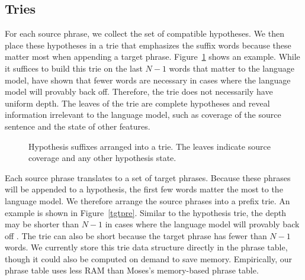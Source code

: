\documentclass[11pt]{article}
\begin{document}
\subsection{Tries}
\label{contribution}
For each source phrase, we collect the set of compatible hypotheses.  We then place these hypotheses in a trie that emphasizes the suffix words because these matter most when appending a target phrase.  Figure~\ref{hypsuff} shows an example.  While it suffices to build this trie on the last $N-1$ words that matter to the language model,  have shown that fewer words are necessary in cases where the language model will provably back off.  Therefore, the trie does not necessarily have uniform depth.  The leaves of the trie are complete hypotheses and reveal information irrelevant to the language model, such as coverage of the source sentence and the state of other features.  

\begin{figure}\centering
{}
\caption{\label{hypsuff}Hypothesis suffixes arranged into a trie.  The leaves indicate source coverage and any other hypothesis state.}
\end{figure}

Each source phrase translates to a set of target phrases.  Because these phrases will be appended to a hypothesis, the first few words matter the most to the language model.  We therefore arrange the source phrases into a prefix trie.  An example is shown in Figure~\ref{tgtpre}.  Similar to the hypothesis trie, the depth may be shorter than $N-1$ in cases where the language model will provably back off \cite{zhifei}.  The trie can also be short because the target phrase has fewer than $N-1$ words.  We currently store this trie data structure directly in the phrase table, though it could also be computed on demand to save memory.  Empirically, our phrase table uses less RAM than Moses's memory-based phrase table.  
\end{document}
